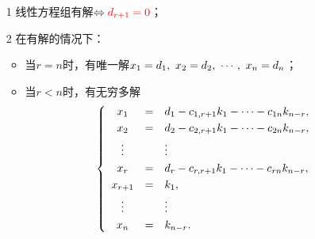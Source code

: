 \begin{frame}
  \begin{footnotesize}
    
    \begin{itemize}
    \item[1] 线性方程组有解$ \Leftrightarrow \textcolor{red}{d_{r+1}=0}$；
    \item[2] 在有解的情况下：
      \begin{itemize}
      \item 当$r=n$时，有唯一解$x_1=d_1,~x_2=d_2,~\cdots,~x_n=d_n$；
      \item 当$r<n$时，有无穷多解
        $$
        \left\{
        \begin{array}{ccl}
          x_1 &=& d_1 - c_{1,r+1}k_1 - \cdots - c_{1n}k_{n-r}, \\[0.1cm]
          x_2 &=& d_2 - c_{2,r+1}k_1 - \cdots - c_{2n}k_{n-r}, \\[0.1cm]
          \vdots & & \vdots \\[0.1cm]
          x_r &=& d_r - c_{r,r+1}k_1 - \cdots - c_{rn}k_{n-r}, \\[0.1cm]
          x_{r+1} &=& k_1, \\[0.1cm]
          \vdots && \vdots \\[0.1cm]
          x_{n} &=& k_{n-r}.
        \end{array}
        \right.
        $$
      \end{itemize}
    \end{itemize}     
  \end{footnotesize}
\end{frame}
